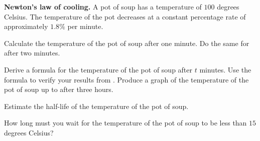 \documentclass[a4paper,oneside,12pt]{article}
\begin{document}
\begin{exercise}
\textbf{Newton's law of cooling.}
A pot of soup has a temperature of $100$ degrees Celsius.  The
temperature of the pot decreases at a constant percentage rate of
approximately $1.8\%$ per minute.
\begin{packedenum}
\item\label{subex:exponential:soup_temperature_1minute_2minutes}
  Calculate the temperature of the pot of soup after one minute.  Do
  the same for after two minutes.

\item\label{subex:exponential:soup_temperature_formula_graph}
  Derive a formula for the temperature of the pot of soup after $t$
  minutes.  Use the formula to verify your results
  from .
  Produce a graph of the temperature of the pot of soup up to after
  three hours.

\item\label{subex:exponential:soup_temperature_half_life}
  Estimate the half-life of the temperature of the pot of soup.

\item\label{subex:exponential:soup_temperature_15_degrees}
  How long must you wait for the temperature of the pot of soup to be
  less than $15$ degrees Celsius?
\end{packedenum}
\end{exercise}
\end{document}
